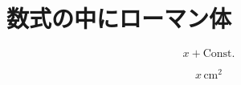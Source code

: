 \section{数式の中にローマン体}
\begin{equation}
x + \mathrm{Const.}
\end{equation}

\begin{equation}
x\,\mathrm{cm^2}
\end{equation}
